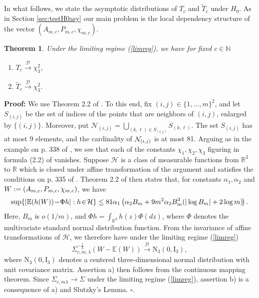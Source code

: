 \documentclass[12pt]{article}
\def\R{\mathbb{R}}
\def\N{\mathbb{N}}
\def\BE{\mathbb{E}}
\def\cd{\stackrel{\mathcal{D}}{\longrightarrow}}
\newtheorem{theorem}{\bf{Theorem}}[section]
\begin{document}
In what follows, we state the asymptotic distributions of  $T_c$ and $\widetilde{T}_c$ under $H_0$. As in Section \ref{sec:testH0asy} our main problem is the local dependency structure of the vector $(A_{m,c}, P_{m,c}, \chi_{m,c})$.
\begin{theorem}
Under the limiting regime (\ref{limreg}), we have for fixed $c\in\N$
\begin{enumerate}
\item[a)] $T_c\cd\chi^2_3$, \\
\item[b)] $\widetilde{T}_c\cd\chi^2_3$.
\end{enumerate}
\end{theorem}
{\bf Proof:} We use Theorem 2.2 of \cite{20}. To this end, fix $(i,j) \in \{1,\ldots,m\}^2$, and let
$S_{(i,j)}$ be the set of indices of the points that are neighbors of $(i,j)$, enlarged by $\{(i,j)\}$. Moreover, put
$\displaystyle\mathcal{N}_{(i,j)}=\textstyle{\bigcup_{(k,\ell)\in S_{(i,j)}}} S_{(k,\ell)}$. The set
$S_{(i,j)}$ has at most 9 elements, and the cardinality of ${\cal N}_{(i,j)}$ is at most 81.
Arguing as in the example on p. 338 of \cite{20}, we see that each of the constants $\chi_1,\chi_2,\chi_3$ figuring in formula (2.2) of \cite{20} vanishes.
Suppose $\mathcal{H}$ is a class of measurable functions from $\R^3$ to $\R$ which is closed under affine transformation of the argument
 and satisfies the conditions on p. 335 of \cite{20}. Theorem 2.2 of \cite{20} then states that, for constants $\alpha_1,\alpha_2$ and $\boldmath{W}:= (A_{m,c}, P_{m,c}, \chi_{m,c})$, we have
\begin{eqnarray*}
\sup\{|\BE(h(\boldmath{W}))\! - \! \Phi h|:h\! \in \! \mathcal{H}\}\le 81\alpha_1\left(\alpha_2B_m+9m^2\alpha_2B_m^3(|\log B_m|+2\log m)\! \right).
\end{eqnarray*}
Here, $B_m$ is $o(1/m)$,  and $\Phi h=\int_{\R^3}h(z)\Phi(dz)$, where $\Phi$ denotes the multivariate standard normal distribution function.
 From the invariance of affine transformations of $\mathcal{H}$, we therefore have under the limiting regime (\ref{limreg})
\begin{equation*}
\Sigma_{c,m,\lambda}^{-\frac{1}{2}}(W-\BE(W))\cd \textrm{N}_3(0,\textrm{I}_3),
\end{equation*}
where $\textrm{N}_3(0,\textrm{I}_3)$ denotes a centered three-dimensional normal distribution with unit covariance matrix.
Assertion a) then follows from the continuous mapping theorem. Since $\Sigma_{c,m\lambda} \to \Sigma$ under the limiting regime (\ref{limreg}),
assertion b) is a consequence of a) and Slutzky's Lemma. \hfill$\square$.
\end{document}
